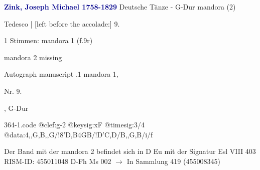 \documentclass[twocolumn]{book}
\begin{document}
\newline \par \vspace{7pt} \textcolor{darkblue}{\textbf{Zink, Joseph Michael  1758-1829}}
\newline Deutsche Tänze - G-Dur
\newline mandora (2)
\newline \begin{itshape}[f.9r, at left:] Tedesco | [left before the accolade:] 9.\end{itshape} 
\newline \textcolor{darkblue}{}  1 Stimmen: mandora 1  (f.9r)
\newline \begin{small} mandora 2 missing\end{small} 
\newline Autograph manuscript
.1  mandora 1, \begin{itshape}Nr. 9.\end{itshape}, G-Dur  
\begin{filecontents*}{364-1.code}
@clef:g-2
@keysig:xF
@timesig:3/4
@data:4,,G,B,,G/!8'D,B4GB/!D'C,D/B,,G,B/i/f
\end{filecontents*}
\newline
%
\newline Der Band mit der mandora 2 befindet sich in D Eu mit der Signatur Esl VIII 403
\newline RISM-ID: 455011048
\newline D-Fh  Ms 002
\newline $\rightarrow$ In Sammlung 419 (455008345)
      
\end{document}
